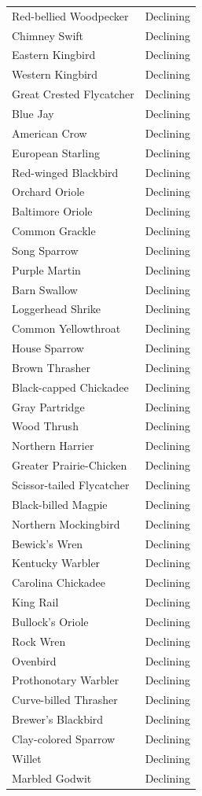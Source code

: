 \documentclass[print]{nuthesis}
\begin{document}
\begin{longtable}{ll}
Red-bellied Woodpecker & Declining\\
Chimney Swift & Declining\\
Eastern Kingbird & Declining\\
\addlinespace
Western Kingbird & Declining\\
Great Crested Flycatcher & Declining\\
Blue Jay & Declining\\
American Crow & Declining\\
European Starling & Declining\\
\addlinespace
Red-winged Blackbird & Declining\\
Orchard Oriole & Declining\\
Baltimore Oriole & Declining\\
Common Grackle & Declining\\
Song Sparrow & Declining\\
\addlinespace
Purple Martin & Declining\\
Barn Swallow & Declining\\
Loggerhead Shrike & Declining\\
Common Yellowthroat & Declining\\
House Sparrow & Declining\\
\addlinespace
Brown Thrasher & Declining\\
Black-capped Chickadee & Declining\\
Gray Partridge & Declining\\
Wood Thrush & Declining\\
Northern Harrier & Declining\\
\addlinespace
Greater Prairie-Chicken & Declining\\
Scissor-tailed Flycatcher & Declining\\
Black-billed Magpie & Declining\\
Northern Mockingbird & Declining\\
Bewick's Wren & Declining\\
\addlinespace
Kentucky Warbler & Declining\\
Carolina Chickadee & Declining\\
King Rail & Declining\\
Bullock's Oriole & Declining\\
Rock Wren & Declining\\
\addlinespace
Ovenbird & Declining\\
Prothonotary Warbler & Declining\\
Curve-billed Thrasher & Declining\\
Brewer's Blackbird & Declining\\
Clay-colored Sparrow & Declining\\
\addlinespace
Willet & Declining\\
Marbled Godwit & Declining\\
\bottomrule
\end{longtable}
\end{document}
